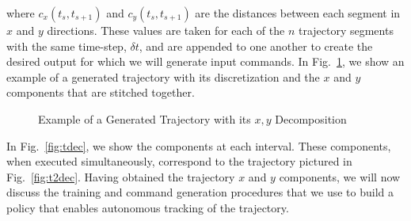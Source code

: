 \documentclass[letterpaper, 10 pt, conference]{ieeeconf}  %
\begin{document}
where $c_{x}(t_s,t_{s+1})$ and $c_{y}(t_s,t_{s+1})$ are the distances between each segment in $x$ and $y$ directions. These values are taken for each of the $n$ trajectory segments with the same time-step, $\delta t$, and are appended to one another to create the desired output for which we will generate input commands. In Fig.~\ref{fig:trajdec}, we show an example of a generated trajectory with its discretization and the $x$ and $y$ components that are stitched together.
\begin{figure}[h]
	\centering
	\caption{Example of a Generated Trajectory with its $x,y$ Decomposition}
	\label{fig:trajdec}
\end{figure}

In Fig.~\ref{fig:tdec}, we show the components at each interval. These components, when executed simultaneously, correspond to the trajectory pictured in Fig.~\ref{fig:t2dec}. Having obtained the trajectory $x$ and $y$ components, we will now discuss the training and command generation procedures that we use to build a policy that enables autonomous tracking of the trajectory.
\end{document}
